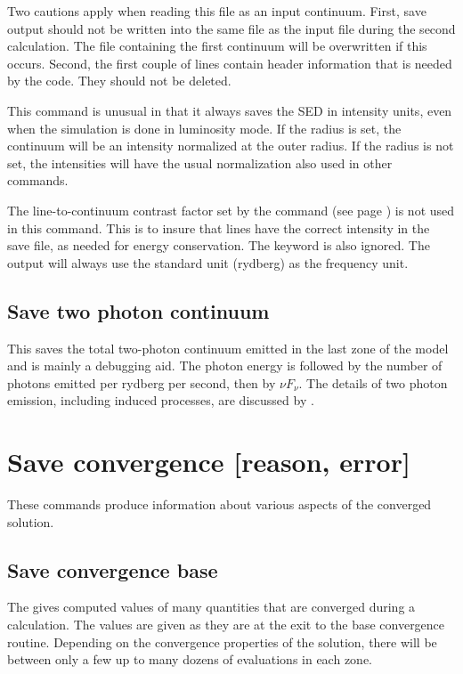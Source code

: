 Two cautions apply when reading this file as an input continuum. First, save
output should not be written into the same file as the input file during the
second calculation. The file containing the first continuum will be
overwritten if this occurs. Second, the first couple of lines contain header
information that is needed by the code. They should not be deleted.

This command is unusual in that it always saves the SED in intensity units,
even when the simulation is done in luminosity mode. If the radius is set, the
continuum will be an intensity normalized at the outer radius. If the radius
is not set, the intensities will have the usual normalization also used in
other  commands.

The line-to-continuum contrast factor 
set by the  command
(see page \pageref{sec:CommandSetSaveLWidth})
is not used in this command.  This is to insure that lines have
the correct intensity in the save file, as needed for energy conservation.
The  keyword is also ignored. The output will always use
the standard unit (rydberg) as the frequency unit.

\subsection{Save two photon continuum}

This saves the total two-photon continuum emitted in the last zone of the model
and is mainly a debugging
aid.  The photon energy is followed by the number of photons emitted per
rydberg per second, then by $\nu F_\nu$.  The details of two photon emission,
including induced processes, are discussed by \citet{Bottorff2006}.

\section{Save convergence [reason, error]}

These commands produce information about various aspects of the converged
solution.

\subsection{Save convergence base}

The gives computed values of many quantities that are converged during
a calculation.  The values are given as they are at the exit to the base
convergence routine.  Depending on the convergence properties of the
solution, there will be between only a few up to many
dozens of evaluations in each zone.

